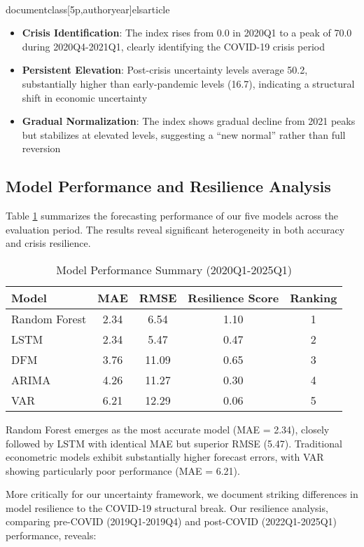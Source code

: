 \\documentclass[5p,authoryear]{elsarticle}
\begin{document}
{\begin{itemize}
    \item \textbf{Crisis Identification}: The index rises from 0.0 in 2020Q1 to a peak of 70.0 during 2020Q4-2021Q1, clearly identifying the COVID-19 crisis period
    \item \textbf{Persistent Elevation}: Post-crisis uncertainty levels average 50.2, substantially higher than early-pandemic levels (16.7), indicating a structural shift in economic uncertainty
    \item \textbf{Gradual Normalization}: The index shows gradual decline from 2021 peaks but stabilizes at elevated levels, suggesting a ``new normal'' rather than full reversion
\end{itemize}

\subsection{Model Performance and Resilience Analysis}

Table \ref{tab:model_performance} summarizes the forecasting performance of our five models across the evaluation period. The results reveal significant heterogeneity in both accuracy and crisis resilience.

\begin{table}[h]
\centering
\caption{Model Performance Summary (2020Q1-2025Q1)}
\label{tab:model_performance}
\begin{tabular}{lcccc}
\toprule
Model & MAE & RMSE & Resilience Score & Ranking \\
\midrule
Random Forest & 2.34 & 6.54 & 1.10 & 1 \\
LSTM & 2.34 & 5.47 & 0.47 & 2 \\
DFM & 3.76 & 11.09 & 0.65 & 3 \\
ARIMA & 4.26 & 11.27 & 0.30 & 4 \\
VAR & 6.21 & 12.29 & 0.06 & 5 \\
\bottomrule
\end{tabular}
\end{table}

Random Forest emerges as the most accurate model (MAE = 2.34), closely followed by LSTM with identical MAE but superior RMSE (5.47). Traditional econometric models exhibit substantially higher forecast errors, with VAR showing particularly poor performance (MAE = 6.21).

More critically for our uncertainty framework, we document striking differences in model resilience to the COVID-19 structural break. Our resilience analysis, comparing pre-COVID (2019Q1-2019Q4) and post-COVID (2022Q1-2025Q1) performance, reveals:

}
\end{document}
